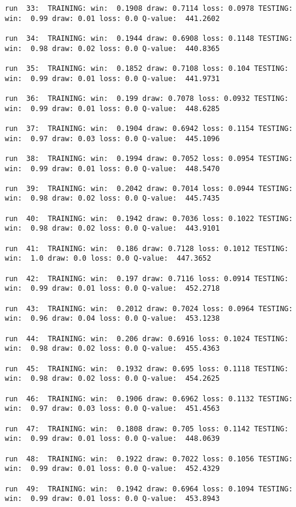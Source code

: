 \documentclass[11pt]{article}
\begin{document}
\begin{Verbatim}[commandchars=\\\{\}]
run  33:  TRAINING: win:  0.1908 draw: 0.7114 loss: 0.0978 TESTING: win:  0.99 draw: 0.01 loss: 0.0 Q-value:  441.2602

run  34:  TRAINING: win:  0.1944 draw: 0.6908 loss: 0.1148 TESTING: win:  0.98 draw: 0.02 loss: 0.0 Q-value:  440.8365

run  35:  TRAINING: win:  0.1852 draw: 0.7108 loss: 0.104 TESTING: win:  0.99 draw: 0.01 loss: 0.0 Q-value:  441.9731

run  36:  TRAINING: win:  0.199 draw: 0.7078 loss: 0.0932 TESTING: win:  0.99 draw: 0.01 loss: 0.0 Q-value:  448.6285

run  37:  TRAINING: win:  0.1904 draw: 0.6942 loss: 0.1154 TESTING: win:  0.97 draw: 0.03 loss: 0.0 Q-value:  445.1096

run  38:  TRAINING: win:  0.1994 draw: 0.7052 loss: 0.0954 TESTING: win:  0.99 draw: 0.01 loss: 0.0 Q-value:  448.5470

run  39:  TRAINING: win:  0.2042 draw: 0.7014 loss: 0.0944 TESTING: win:  0.98 draw: 0.02 loss: 0.0 Q-value:  445.7435

run  40:  TRAINING: win:  0.1942 draw: 0.7036 loss: 0.1022 TESTING: win:  0.98 draw: 0.02 loss: 0.0 Q-value:  443.9101

run  41:  TRAINING: win:  0.186 draw: 0.7128 loss: 0.1012 TESTING: win:  1.0 draw: 0.0 loss: 0.0 Q-value:  447.3652

run  42:  TRAINING: win:  0.197 draw: 0.7116 loss: 0.0914 TESTING: win:  0.99 draw: 0.01 loss: 0.0 Q-value:  452.2718

run  43:  TRAINING: win:  0.2012 draw: 0.7024 loss: 0.0964 TESTING: win:  0.96 draw: 0.04 loss: 0.0 Q-value:  453.1238

run  44:  TRAINING: win:  0.206 draw: 0.6916 loss: 0.1024 TESTING: win:  0.98 draw: 0.02 loss: 0.0 Q-value:  455.4363

run  45:  TRAINING: win:  0.1932 draw: 0.695 loss: 0.1118 TESTING: win:  0.98 draw: 0.02 loss: 0.0 Q-value:  454.2625

run  46:  TRAINING: win:  0.1906 draw: 0.6962 loss: 0.1132 TESTING: win:  0.97 draw: 0.03 loss: 0.0 Q-value:  451.4563

run  47:  TRAINING: win:  0.1808 draw: 0.705 loss: 0.1142 TESTING: win:  0.99 draw: 0.01 loss: 0.0 Q-value:  448.0639

run  48:  TRAINING: win:  0.1922 draw: 0.7022 loss: 0.1056 TESTING: win:  0.99 draw: 0.01 loss: 0.0 Q-value:  452.4329

run  49:  TRAINING: win:  0.1942 draw: 0.6964 loss: 0.1094 TESTING: win:  0.99 draw: 0.01 loss: 0.0 Q-value:  453.8943


\end{Verbatim}
\end{document}
